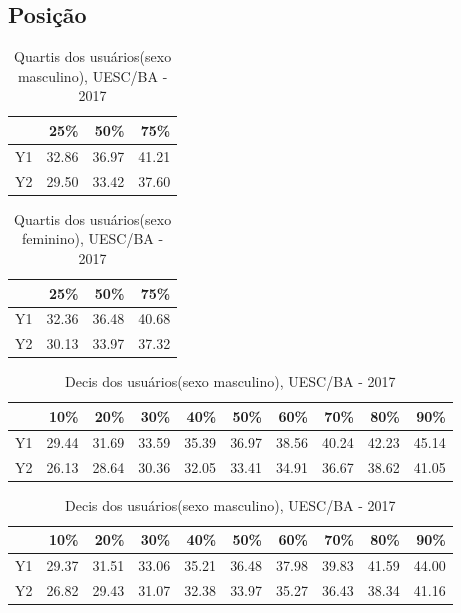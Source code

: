 \documentclass[a4paper, 10pt]{article}
\begin{document}
		\subsection{Posição}
			\begin{table}[!htb]
				\caption{Quartis dos usuários(sexo masculino), UESC/BA - 2017}
				\begin{tabular}{crrr}
					\hline
					& 25\% & 50\% & 75\% \\
					\hline
					Y1 & 32.86 & 36.97 & 41.21 \\
					Y2 & 29.50 & 33.42 & 37.60 \\
					\hline
				\end{tabular}
			\end{table}
			\begin{table}[!htb]
				\caption{Quartis dos usuários(sexo feminino), UESC/BA - 2017}
				\begin{tabular}{crrr}
					\hline
					& 25\% & 50\% & 75\% \\
					\hline
					Y1 & 32.36 & 36.48 & 40.68 \\
					Y2 & 30.13 & 33.97 & 37.32 \\
					\hline
				\end{tabular}
			\end{table}
			\begin{table}[!htb]
				\caption{Decis dos usuários(sexo masculino), UESC/BA - 2017}
				\begin{tabular}{crrrrrrrrr}
					\hline
					& 10\% & 20\% & 30\% & 40\% & 50\% & 60\% & 70\% & 80\% & 90\% \\
					\hline
					Y1 & 29.44 & 31.69 & 33.59 & 35.39 & 36.97 & 38.56 & 40.24 & 42.23 & 45.14 \\
					Y2 & 26.13 & 28.64 & 30.36 & 32.05 & 33.41 & 34.91 & 36.67 & 38.62 & 41.05 \\
					\hline
				\end{tabular}
			\end{table}
			\begin{table}[!htb]
				\caption{Decis dos usuários(sexo masculino), UESC/BA - 2017}
				\begin{tabular}{crrrrrrrrr}
					\hline
					& 10\% & 20\% & 30\% & 40\% & 50\% & 60\% & 70\% & 80\% & 90\% \\
					\hline
					Y1 & 29.37 & 31.51 & 33.06 & 35.21 & 36.48 & 37.98 & 39.83 & 41.59 & 44.00\\
					Y2 & 26.82 & 29.43 & 31.07 & 32.38 & 33.97 & 35.27 & 36.43 & 38.34 & 41.16\\
					\hline
				\end{tabular}
			\end{table}
\end{document}
